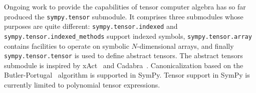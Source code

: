 Ongoing work to provide the capabilities of tensor computer algebra has so far
produced the \verb|sympy.tensor| submodule.  It comprises three
submodules whose purposes are quite different: \texttt{sympy.\allowbreak{}tensor.\allowbreak{}indexed} and
\texttt{sympy.\allowbreak{}tensor.\allowbreak{}indexed\_methods} support indexed symbols,
\texttt{sympy.\allowbreak{}tensor.\allowbreak{}array} contains facilities to operate on symbolic $N$-dimensional
arrays, and finally \texttt{sympy.\allowbreak{}tensor.\allowbreak{}tensor} is used to define abstract tensors.
The abstract tensors submodule
is inspired by xAct~\cite{xAct} and Cadabra~\cite{Peeters2007cadabra}.
Canonicalization based on the Butler-Portugal~\cite{ManssurPortugal1999}
algorithm is supported in SymPy.  Tensor support in SymPy is currently limited to polynomial tensor
expressions.
